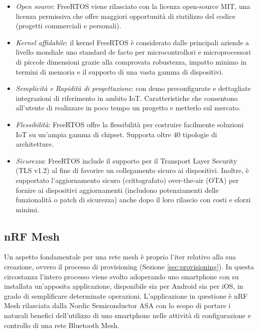 \begin{itemize}
    \item \textit{Open source}: FreeRTOS viene rilasciato con la licenza open-source MIT, una licenza permissiva che offre maggiori opportunità di riutilizzo del codice (progetti commerciali e personali).
    
    \item \textit{Kernel affidabile}: il kernel FreeRTOS è considerato dalle principali aziende a livello mondiale uno standard de facto per microcontrollori e microprocessori di piccole dimensioni grazie alla comprovata robustezza, impatto minimo in termini di memoria e il supporto di una vasta gamma di dispositivi.
    
    \item \textit{Semplicità e Rapidità di progettazione}: con demo preconfigurate e dettagliate integrazioni di riferimento in ambito IoT. Caratteristiche che consentono all'utente di realizzare in poco tempo un progetto e metterlo sul mercato.
    
    \item \textit{Flessibilità}: FreeRTOS offre la flessibilità per costruire facilmente soluzioni IoT su un'ampia gamma di chipset. Supporta oltre 40 tipologie di architetture.
    
    \item \textit{Sicurezza}: FreeRTOS include il supporto per il Transport Layer Security (TLS v1.2) al fine di favorire un collegamento sicuro ai dispositivi. Inoltre, è supportato l'aggiornamento sicuro (crittografato) over-the-air (OTA) per fornire ai dispositivi aggiornamenti (includono potenziamenti delle funzionalità o patch di sicurezza) anche dopo il loro rilascio con costi e sforzi minimi.
    
\end{itemize}

\subsection{nRF Mesh}
Un aspetto fondamentale per una rete mesh è proprio l'iter relativo alla sua creazione, ovvero il processo di provisioning (Sezione \ref{sec:provisioning}). In questa circostanza l'intero processo viene svolto adoperando uno smartphone con su installata un'apposita applicazione, disponibile sia per Android sia per iOS, in grado di semplificare determinate operazioni. L'applicazione in questione è nRF Mesh rilasciata dalla Nordic Semiconductor ASA con lo scopo di portare i naturali benefici dell'utilizzo di uno smartphone nelle attività di configurazione e controllo di una rete Bluetooth Mesh.\\

